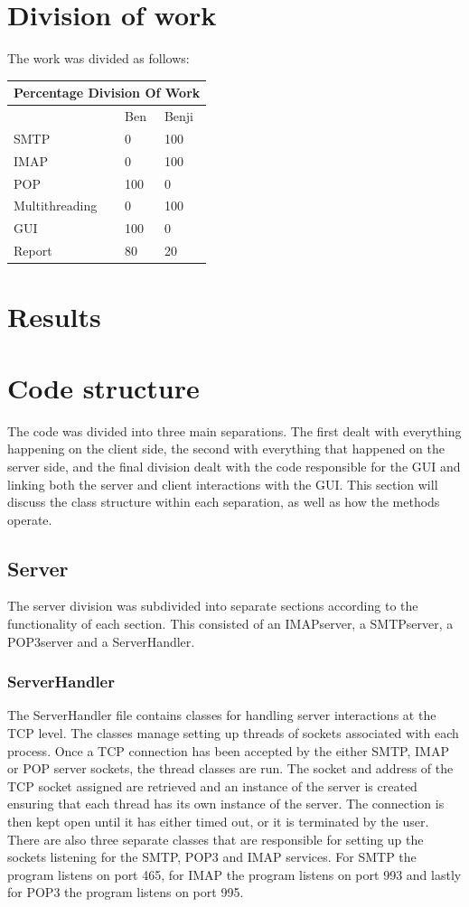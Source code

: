 \documentclass[11pt]{article}
\begin{document}
\begin{multicols}{2}
\section{Division of work}
The work was divided as follows:\\
\break{}
\begin{tabular}{ |p{3cm}||p{2cm}|p{2cm}|}
 \hline
 \multicolumn{3}{|c|}{Percentage Division Of Work} \\
 \hline
  & Ben & Benji\\
 \hline
 SMTP & 0 & 100\\
 IMAP & 0 & 100\\
 POP & 100 & 0\\
 Multithreading & 0 & 100\\
 GUI & 100 & 0\\
 Report & 80 & 20\\
 \hline
\end{tabular}

\section{Results}

\section{Code structure}
The code was divided into three main separations. The first dealt with everything happening on the client side, the second with everything that happened on the server side, and the final division dealt with the code responsible for the GUI and linking both the server and client interactions with the GUI. This section will discuss the class structure within each separation, as well as how the methods operate.

\subsection{Server}
The server division was subdivided into separate sections according to the functionality of each section. This consisted of an IMAPserver, a SMTPserver, a POP3server and a ServerHandler.
\subsubsection{ServerHandler}
The ServerHandler file contains classes for handling server interactions at the TCP level. The classes manage setting up threads of sockets associated with each process. Once a TCP connection has been accepted by the either SMTP, IMAP or POP server sockets, the thread classes are run. The socket and address of the TCP socket assigned are retrieved and an instance of the server is created ensuring that each thread has its own instance of the server. The connection is then kept open until it has either timed out, or it is terminated by the user.\\
There are also three separate classes that are responsible for setting up the sockets listening for the SMTP, POP3 and IMAP services. For SMTP the program listens on port 465, for IMAP the program listens on port 993 and lastly for POP3 the program listens on port 995.\\

\end{multicols}
\end{document}
